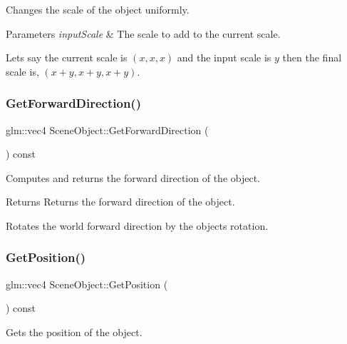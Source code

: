 Changes the scale of the object uniformly.


\begin{DoxyParams}{Parameters}
{\em input\+Scale} & The scale to add to the current scale.\\
\hline
\end{DoxyParams}
Let\textquotesingle{}s say the current scale is $(x, x, x)$ and the input scale is $y$ then the final scale is, $(x + y, x + y, x + y)$. \hypertarget{class_scene_object_a17a33730106caaeeaede13682440eadc}{}\label{class_scene_object_a17a33730106caaeeaede13682440eadc}
\subsubsection{\texorpdfstring{Get\+Forward\+Direction()}{GetForwardDirection()}}
{\footnotesize\ttfamily glm\+::vec4 Scene\+Object\+::\+Get\+Forward\+Direction (\begin{DoxyParamCaption}{ }\end{DoxyParamCaption}) const\hspace{0.3cm}{\ttfamily [virtual]}}



Computes and returns the forward direction of the object.

\begin{DoxyReturn}{Returns}
Returns the forward direction of the object.
\end{DoxyReturn}
Rotates the world forward direction by the object\textquotesingle{}s rotation. \hypertarget{class_scene_object_a599d20872bfe1f3de5a40dd4535047a5}{}\label{class_scene_object_a599d20872bfe1f3de5a40dd4535047a5}
\subsubsection{\texorpdfstring{Get\+Position()}{GetPosition()}}
{\footnotesize\ttfamily glm\+::vec4 Scene\+Object\+::\+Get\+Position (\begin{DoxyParamCaption}{ }\end{DoxyParamCaption}) const\hspace{0.3cm}{\ttfamily [inline]}}



Gets the position of the object.

